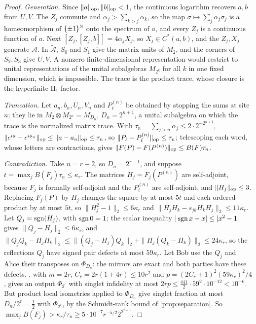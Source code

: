 \begin{proof}
\emph{Generation.} Since $\lVert a\rVert_{\mathrm{op}},\lVert b\rVert_{\mathrm{op}}<1$, the continuous logarithm recovers $a,b$ from $U,V$. The $Z_j$ commute and
$\alpha_j>\sum_{k>j}\alpha_k$, so the map $\sigma\mapsto\sum_j\alpha_j\sigma_j$ is a homeomorphism of $\{\pm1\}^{\mathbb N}$ onto the spectrum of $a$, and
every $Z_j$ is a continuous function of $a$. Next $[Z_j,[Z_j,b]]=4\alpha_jX_j$, so $X_j\in C^*(a,b)$, and the $Z_j,X_j$ generate $\mathcal A$. In
$\widetilde{\mathcal A}$, $S_0$ and $S_1$ give the matrix units of $M_2$, and the corners of $S_2,S_3$ give $U,V$. A nonzero
finite-dimensional representation would restrict to unital representations of the unital subalgebras $M_{2^k}$ for all $k$ in one fixed
dimension, which is impossible. The trace is the product trace, whose closure is the hyperfinite $\mathrm{II}_1$ factor.

\emph{Truncation.} Let $a_n,b_n,U_n,V_n$ and $P^{(n)}_\ell$ be obtained by stopping the sums at site $n$; they lie in
$M_2\otimes M_{2^n}=M_{D_n}$, $D_n=2^{n+1}$, a unital subalgebra on which the trace is the normalized matrix trace. With
$\tau_n=\sum_{j>n}\alpha_j\le2\cdot2^{-2^{n+1}}$, $\lVert e^{ia}-e^{ia_n}\rVert_{\mathrm{op}}\le\lVert a-a_n\rVert_{\mathrm{op}}\le\tau_n$, so $\lVert P_\ell-P^{(n)}_\ell\rVert_{\mathrm{op}}\le\tau_n$; telescoping
each word, whose letters are contractions, gives $\lVert F(P)-F(P^{(n)})\rVert_{\mathrm{op}}\le B(F)\tau_n$.

\emph{Contradiction.} Take $n=r-2$, so $D_n=2^{r-1}$, and suppose $t=\max_jB(F_j)\tau_n\le\kappa_r$. The matrices $H_j=F_j(P^{(n)})$ are
self-adjoint, because $F_j$ is formally self-adjoint and the $P^{(n)}_\ell$ are self-adjoint, and $\lVert H_j\rVert_{\mathrm{op}}\le3$. Replacing $F_j(P)$ by
$H_j$ changes the square by at most $5t$ and each ordered product by at most $5t$, so $\|H_j^2-1\|_2\le6\kappa_r$ and
$\|H_jH_k-s_{jk}H_kH_j\|_2\le11\kappa_r$. Let $Q_j=\operatorname{sgn}(H_j)$, with $\operatorname{sgn}0=1$; the scalar inequality $|\operatorname{sgn} x-x|\le|x^2-1|$ gives
$\|Q_j-H_j\|_2\le6\kappa_r$, and $\|Q_jQ_k-H_jH_k\|_2\le\|(Q_j-H_j)Q_k\|_2+\|H_j(Q_k-H_k)\|_2\le24\kappa_r$, so the reflections $Q_j$ have
signed pair defects at most $59\kappa_r$. Let Bob use the $Q_j$ and Alice their transposes on $\Phi_{D_n}$: the mirrors are exact and
both parties have these defects. , with $m=2r$, $C_r=2r(1+4r)\le10r^2$ and $p=(2C_r+1)^2(59\kappa_r)^2/4$, gives an
output $\Phi_{2^r}$ with singlet infidelity at most $2rp\le\frac{441}2\cdot59^2\cdot10^{-12}<10^{-6}$. But product local isometries applied
to $\Phi_{D_n}$ give singlet fraction at most $D_n/2^r=\frac12$ with $\Phi_{2^r}$, by the Schmidt-rank bound of \cref{prop:separation}.
So $\max_jB(F_j)>\kappa_r/\tau_n\ge5\cdot10^{-7}r^{-5/2}2^{2^{r-1}}$.
\end{proof}


